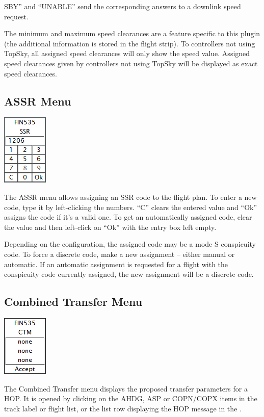\documentclass[11pt,a4paper]{memoir}
\newenvironment{Warn}
  {\begin{shaded}\marginnote{\fbox{Warning}}}
  {\end{shaded}}
\begin{document}
SBY” and “UNABLE” send the corresponding answers to a downlink speed request.

\begin{Warn}
The minimum and maximum speed clearances are a feature specific to this plugin (the additional information is stored in the flight strip). To controllers not using TopSky, all assigned speed clearances will only show the speed value. Assigned speed clearances given by controllers not using TopSky will be displayed as exact speed clearances.
\end{Warn}

\subsection{ASSR Menu}
\label{menu:assr}
\includegraphics{img/assr.png}

The ASSR menu allows assigning an SSR code to the flight plan. To enter a new code, type it by left-clicking the numbers. “C” clears the entered value and “Ok” assigns the code if it’s a valid one. To get an automatically assigned code, clear the value and then left-click on “Ok” with the entry box left empty.

Depending on the configuration, the assigned code may be a mode S conspicuity code. To force a discrete code, make a new assignment – either manual or automatic. If an automatic assignment is requested for a flight with the conspicuity code currently assigned, the new assignment will be a discrete code.

\subsection{Combined Transfer Menu}
\label{menu:ctm}
\includegraphics{img/ctm.png}

The Combined Transfer menu displays the proposed transfer parameters for a HOP. It is opened by clicking on the AHDG, ASP or COPN/COPX items in the track label or flight list, or the list row displaying the HOP message in the \textit{}.
\end{document}
